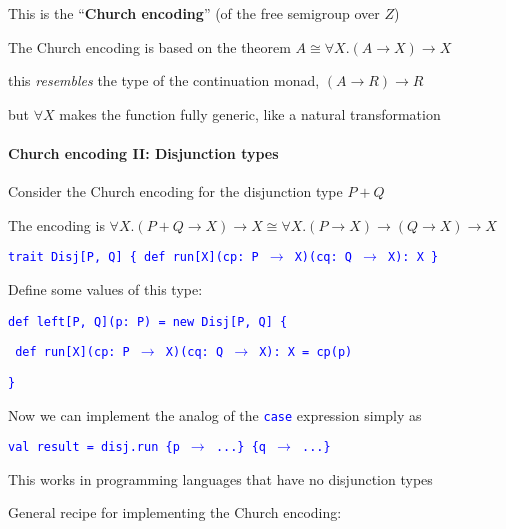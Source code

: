 This is the \textsf{``}\textbf{Church encoding}\textsf{''} (of the free semigroup
over $Z$)

The Church encoding is based on the theorem {\footnotesize{}$A\cong\forall X.\left(A\rightarrow X\right)\rightarrow X$} 

this \emph{resembles} the type of the continuation monad, $\left(A\rightarrow R\right)\rightarrow R$ 

but $\forall X$ makes the function fully generic, like a natural
transformation


\paragraph{Church encoding II: Disjunction types}

Consider the Church encoding for the disjunction type $P+Q$ 

The encoding is {\footnotesize{}$\forall X.\left(P+Q\rightarrow X\right)\rightarrow X\cong\forall X.\left(P\rightarrow X\right)\rightarrow\left(Q\rightarrow X\right)\rightarrow X$}{\footnotesize\par}

\texttt{\textcolor{blue}{\footnotesize{}trait Disj{[}P, Q{]} \{ def
run{[}X{]}(cp: P $\rightarrow$ X)(cq: Q $\rightarrow$ X): X \}}}{\footnotesize\par}

Define some values of this type:

\texttt{\textcolor{blue}{\footnotesize{}def left{[}P, Q{]}(p: P) =
new Disj{[}P, Q{]} \{}}{\footnotesize\par}

\texttt{\textcolor{blue}{\footnotesize{} def run{[}X{]}(cp: P $\rightarrow$
X)(cq: Q $\rightarrow$ X): X = cp(p) }}{\footnotesize\par}

\texttt{\textcolor{blue}{\footnotesize{}\}}}{\footnotesize\par}

Now we can implement the analog of the \texttt{\textcolor{blue}{\footnotesize{}case}}
expression simply as

\texttt{\textcolor{blue}{\footnotesize{}val result = disj.run \{p
$\rightarrow$ ...\} \{q $\rightarrow$ ...\}}}{\footnotesize\par}

This works in programming languages that have no disjunction types

General recipe for implementing the Church encoding: 

